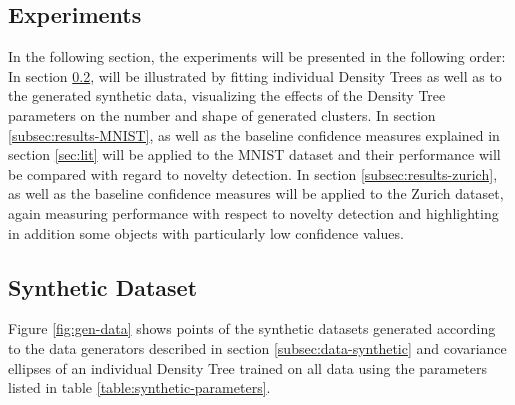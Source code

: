 \documentclass[10pt]{article}
\begin{document}
\subsection{Experiments}
In the following section, the experiments will be presented in the following order: In section \ref{subsec:results-synthetic},  will be illustrated by fitting individual Density Trees as well as  to the generated synthetic data, visualizing the effects of the Density Tree parameters on the number and shape of generated clusters. In section \ref{subsec:results-MNIST},  as well as the baseline confidence measures explained in section \ref{sec:lit} will be applied to the \gls{MNIST} dataset and their performance will be compared with regard to novelty detection. In section \ref{subsec:results-zurich},  as well as the baseline confidence measures will be applied to the Zurich dataset, again measuring performance with respect to novelty detection and highlighting in addition some objects with particularly low confidence values.

\subsection{Synthetic Dataset}
\label{subsec:results-synthetic}


Figure \ref{fig:gen-data} shows points of the synthetic datasets generated according to the data generators described in section  \ref{subsec:data-synthetic} and covariance ellipses of an individual Density Tree trained on all data using the parameters listed in table \ref{table:synthetic-parameters}.
\end{document}
